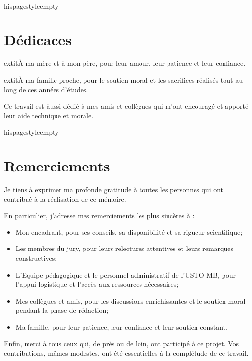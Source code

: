 ﻿﻿\documentclass[12pt,a4paper,oneside]{report}
\begin{document}
\cleardoublepage
	hispagestyle{empty}
\chapter*{Dédicaces}
\vspace*{3.5cm}
\begin{center}
\large
	extit{\`A ma m\`ere et \`a mon p\`ere, pour leur amour, leur patience et leur confiance.}
\medskip

	extit{\`A ma famille proche, pour le soutien moral et les sacrifices r\'ealis\'es tout au long de ces ann\'ees d'\'etudes.}
\end{center}
\vspace{1cm}
\noindent Ce travail est \`aussi d\'edi\'e \`a mes amis et coll\`egues qui m'ont encourag\'e et apport\'e leur aide technique et morale.
\clearpage

	hispagestyle{empty}
\chapter*{Remerciements}
\noindent Je tiens \`a exprimer ma profonde gratitude \`a toutes les personnes qui ont contribu\'e \`a la réalisation de ce m\'emoire.

\smallskip
\noindent En particulier, j'adresse mes remerciements les plus sinc\`eres \`a :
\begin{itemize}
  \item Mon encadrant, pour ses conseils, sa disponibilité et sa rigueur scientifique;
  \item Les membres du jury, pour leurs relectures attentives et leurs remarques constructives;
  \item L'Equipe pédagogique et le personnel administratif de l'USTO-MB, pour l'appui logistique et l'accès aux ressources nécessaires;
  \item Mes coll\`egues et amis, pour les discussions enrichissantes et le soutien moral pendant la phase de r\'edaction;
  \item Ma famille, pour leur patience, leur confiance et leur soutien constant.
\end{itemize}

\noindent Enfin, merci \`a tous ceux qui, de pr\`es ou de loin, ont particip\'e \`a ce projet. Vos contributions, m\^emes modestes, ont \'et\'e essentielles \`a la compl\'etude de ce travail.
\clearpage
\end{document}
